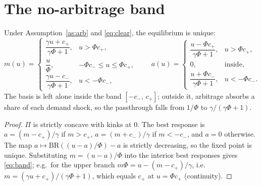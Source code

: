 \section{The no-arbitrage band}\label{sec:band}
\begin{proposition}\label{prop:band}
Under Assumption~\ref{as:arb} and \eqref{eq:clear}, the equilibrium is unique:
\begin{equation}\label{eq:band}
m(u)=\begin{cases}
\dfrac{\gamma u + c_+}{\gamma\Phi+1}, & u>\Phi c_+,\\[2mm]
\dfrac{u}{\Phi}, & -\Phi c_-\le u\le \Phi c_+,\\[2mm]
\dfrac{\gamma u - c_-}{\gamma\Phi+1}, & u<-\Phi c_- ,
\end{cases}
\qquad
a(u)=\begin{cases}\dfrac{u-\Phi c_+}{\gamma\Phi+1}, & u>\Phi c_+,\\[1mm] 0, & \text{inside},\\[1mm] \dfrac{u+\Phi c_-}{\gamma\Phi+1}, & u<-\Phi c_-.\end{cases}
\end{equation}
The basis is left alone inside the band $[-c_-,\,c_+]$; outside it, arbitrage absorbs a share of each demand shock, so
the passthrough falls from $1/\Phi$ to $\gamma/(\gamma\Phi+1)$.
\end{proposition}
\begin{proof}
$\Pi$ is strictly concave with kinks at $0$. The best response is $a=(m-c_+)/\gamma$ if $m>c_+$, $a=(m+c_-)/\gamma$ if
$m<-c_-$, and $a=0$ otherwise. The map $a\mapsto \mathrm{BR}((u-a)/\Phi)-a$ is strictly decreasing, so the fixed point is
unique. Substituting $m=(u-a)/\Phi$ into the interior best responses gives \eqref{eq:band}; e.g.\ for the upper branch
$m\Phi=u-(m-c_+)/\gamma$, i.e.\ $m=(\gamma u+c_+)/(\gamma\Phi+1)$, which equals $c_+$ at $u=\Phi c_+$ (continuity).
\end{proof}

